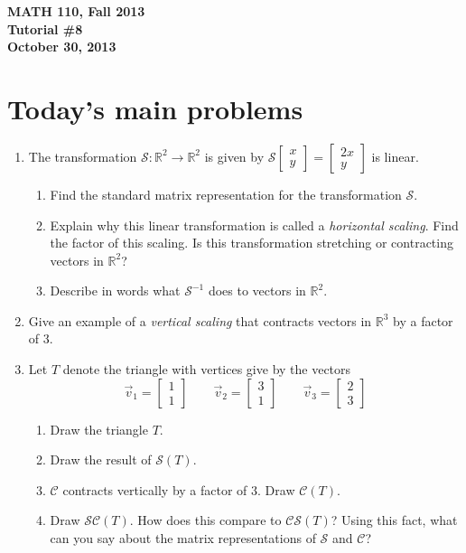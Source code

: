 \documentclass[11pt]{exam}
\newcommand{\R}{\mathbb{R}}
\newcommand{\mat}[1]{\begin{bmatrix}#1\end{bmatrix}}
\newcommand{\mthCourse}{MATH 110}
\newcommand{\mthTerm}{Fall 2013}
\newcommand{\mthTutorialNumber}{8}
\newcommand{\mthDate}{October 30, 2013}
\begin{document}
{\large
	\begin{center}
		{\bf \mthCourse, \mthTerm}\\ 
		{\bf Tutorial \#\mthTutorialNumber}\\
		{\bf \mthDate}
	\end{center}
}

\section*{Today's main problems}

\begin{enumerate}
	\item 
		The transformation $\mathcal S:\R^2\to\R^2$ is
		given by $\mathcal S\mat{x\\y}=\mat{2x\\y}$ is linear.
	\begin{enumerate}
		\item Find the standard matrix representation for the transformation $\mathcal S$.
		\item Explain why this linear transformation is called 
			a \emph{horizontal scaling}.  Find the factor of this scaling.
			Is this transformation stretching or contracting vectors in $\R^2$?
		\item Describe in words what $\mathcal S^{-1}$ does to vectors in $\R^2$.
	\end{enumerate}
	
	\item Give an example of a \emph{vertical scaling} that contracts
	vectors in $\R^3$ by a factor of 3.

	\item Let $T$ denote the triangle with vertices give by the vectors
		\[
			\vec v_1=\mat{1\\1}\qquad
			\vec v_2=\mat{3\\1}\qquad
			\vec v_3=\mat{2\\3}
		\]
	\begin{enumerate}
		\item Draw the triangle $T$.
		\item Draw the result of $\mathcal S (T)$.
		\item $\mathcal C$ contracts vertically by a factor of $3$.
			Draw $\mathcal C(T)$.
		\item Draw $\mathcal S\mathcal C(T)$.  How does this compare
			to $\mathcal C\mathcal S(T)$?  Using this fact,
			what can you say about the
			matrix representations of $\mathcal S$ and $\mathcal C$?
	\end{enumerate}

\end{enumerate}
\end{document}
